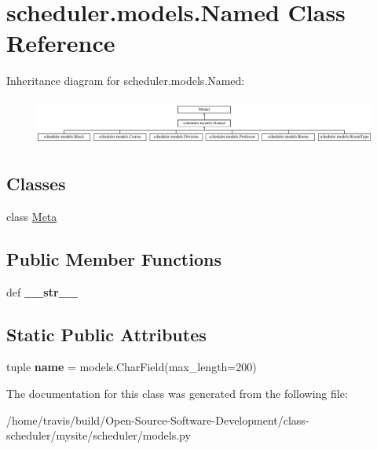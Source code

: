 \hypertarget{classscheduler_1_1models_1_1_named}{\section{scheduler.\-models.\-Named Class Reference}
\label{classscheduler_1_1models_1_1_named}
}
Inheritance diagram for scheduler.\-models.\-Named\-:\begin{figure}[H]
\begin{center}
\leavevmode
\includegraphics[height=1.538462cm]{classscheduler_1_1models_1_1_named}
\end{center}
\end{figure}
\subsection*{Classes}
\begin{DoxyCompactItemize}
\item 
class \hyperlink{classscheduler_1_1models_1_1_named_1_1_meta}{Meta}
\end{DoxyCompactItemize}
\subsection*{Public Member Functions}
\begin{DoxyCompactItemize}
\item 
\hypertarget{classscheduler_1_1models_1_1_named_a37b97c2fa4acbf5c61ca4cdff1410d47}{def {\bfseries \-\_\-\-\_\-str\-\_\-\-\_\-}}\label{classscheduler_1_1models_1_1_named_a37b97c2fa4acbf5c61ca4cdff1410d47}

\end{DoxyCompactItemize}
\subsection*{Static Public Attributes}
\begin{DoxyCompactItemize}
\item 
\hypertarget{classscheduler_1_1models_1_1_named_a5e5e18340ced82b633c6c913447d602f}{tuple {\bfseries name} = models.\-Char\-Field(max\-\_\-length=200)}\label{classscheduler_1_1models_1_1_named_a5e5e18340ced82b633c6c913447d602f}

\end{DoxyCompactItemize}


The documentation for this class was generated from the following file\-:\begin{DoxyCompactItemize}
\item 
/home/travis/build/\-Open-\/\-Source-\/\-Software-\/\-Development/class-\/scheduler/mysite/scheduler/models.\-py\end{DoxyCompactItemize}
